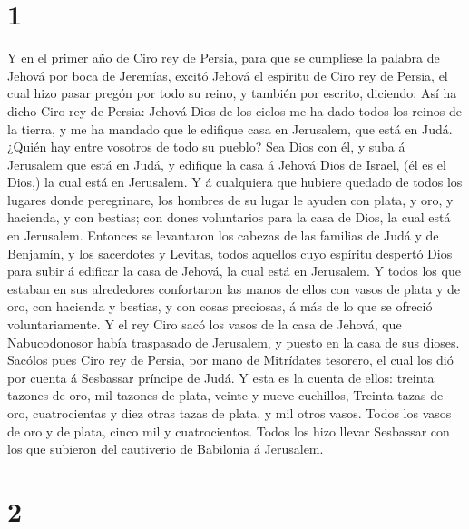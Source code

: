 \hypertarget{section}{%
\section{1}\label{section}}

 Y en el primer año de Ciro rey de Persia, para que se
cumpliese la palabra de Jehová por boca de Jeremías, excitó Jehová el
espíritu de Ciro rey de Persia, el cual hizo pasar pregón por todo su
reino, y también por escrito, diciendo:  Así ha dicho Ciro
rey de Persia: Jehová Dios de los cielos me ha dado todos los reinos de
la tierra, y me ha mandado que le edifique casa en Jerusalem, que está
en Judá.  ¿Quién hay entre vosotros de todo su pueblo? Sea
Dios con él, y suba á Jerusalem que está en Judá, y edifique la casa á
Jehová Dios de Israel, (él es el Dios,) la cual está en Jerusalem.
 Y á cualquiera que hubiere quedado de todos los lugares
donde peregrinare, los hombres de su lugar le ayuden con plata, y oro, y
hacienda, y con bestias; con dones voluntarios para la casa de Dios, la
cual está en Jerusalem.  Entonces se levantaron los
cabezas de las familias de Judá y de Benjamín, y los sacerdotes y
Levitas, todos aquellos cuyo espíritu despertó Dios para subir á
edificar la casa de Jehová, la cual está en Jerusalem.  Y
todos los que estaban en sus alrededores confortaron las manos de ellos
con vasos de plata y de oro, con hacienda y bestias, y con cosas
preciosas, á más de lo que se ofreció voluntariamente.  Y
el rey Ciro sacó los vasos de la casa de Jehová, que Nabucodonosor había
traspasado de Jerusalem, y puesto en la casa de sus dioses.
 Sacólos pues Ciro rey de Persia, por mano de Mitrídates
tesorero, el cual los dió por cuenta á Sesbassar príncipe de Judá.
 Y esta es la cuenta de ellos: treinta tazones de oro, mil
tazones de plata, veinte y nueve cuchillos,  Treinta
tazas de oro, cuatrocientas y diez otras tazas de plata, y mil otros
vasos.  Todos los vasos de oro y de plata, cinco mil y
cuatrocientos. Todos los hizo llevar Sesbassar con los que subieron del
cautiverio de Babilonia á Jerusalem.

\hypertarget{section-1}{%
\section{2}\label{section-1}}

